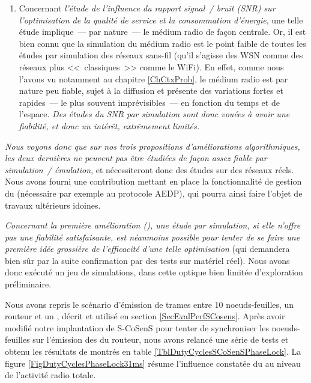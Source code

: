 \begin{enumerate}
\item Concernant \emph{l'étude de l'influence du rapport signal~/ bruit
(SNR) sur l'optimisation de la qualité de service et la consommation
d'énergie}, une telle étude implique~--- par nature~--- le médium radio
de façon centrale. Or, il est bien connu que la simulation du médium radio
est le point faible de toutes les études par simulation des réseaux
sans-fil (qu'il s'agisse des WSN comme des réseaux plus <<~classiques~>>
comme le WiFi). En effet, comme nous l'avons vu notamment au chapitre
\ref{ChCtxProb}, le médium radio est par nature peu fiable, sujet à la
diffusion et présente des variations fortes et rapides~--- le plus souvent
imprévisibles~--- en fonction du temps et de l'espace. \emph{Des études
du SNR par simulation sont donc vouées à avoir une fiabilité, et donc
un intérêt, extrêmement limités.}

\end{enumerate}

\smallskip

\emph{Nous voyons donc que sur nos trois propositions d'améliorations
algorithmiques, les deux dernières ne peuvent pas être étudiées de façon
assez fiable par simulation~/ émulation}, et nécessiteront donc des études
sur des réseaux réels. Nous avons fourni une contribution mettant en place
la fonctionnalité de gestion du  \cite{PRriotEnh13}
(nécessaire par exemple au protocole AEDP), qui pourra ainsi faire l'objet
de travaux ultérieurs idoines.

\smallskip

\emph{Concernant la première amélioration (), une
étude par simulation, si elle n'offre pas une fiabilité satisfaisante,
est néanmoins possible pour tenter de se faire une première idée grossière
de l'efficacité d'une telle optimisation} (qui demandera bien sûr par la
suite confirmation par des tests sur matériel réel). Nous avons donc exécuté
un jeu de simulations, dans cette optique bien limitée d'exploration
préliminaire.

Nous avons repris le scénario d'émission de trames entre 10 noeuds-feuilles,
un routeur et un , décrit et utilisé en section
\vref{SecEvalPerfSCosens}. Après avoir modifié notre implantation
de S-CoSenS pour tenter de synchroniser les noeuds-feuilles sur l'émission
des  du routeur, nous avons relancé une série de tests et
obtenu les résultats de  montrés en table
\vref{TblDutyCyclesSCoSenSPhaseLock}. La figure
\vref{FigDutyCyclesPhaseLock31ms} résume l'influence 
constatée du  au niveau de l'activité radio totale.


